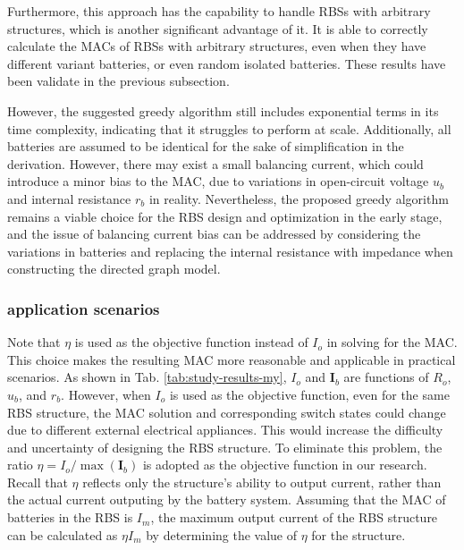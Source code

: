 \documentclass{article}
\begin{document}
Furthermore, this approach has the capability to handle RBSs with arbitrary structures, which is another significant advantage of it. 
It is able to correctly calculate the MACs of RBSs with arbitrary structures, even when they have different variant batteries, or even random isolated batteries. 
These results have been validate in the previous subsection.


However, the suggested greedy algorithm still includes exponential terms in its time complexity, indicating that it struggles to perform at scale. 
Additionally, all batteries are assumed to be identical for the sake of simplification in the derivation.
However, there may exist a small balancing current, which could introduce a minor bias to the MAC, due to variations in open-circuit voltage $u_b$ and internal resistance $r_b$ in reality.
Nevertheless, the proposed greedy algorithm remains a viable choice for the RBS design and optimization in the early stage, and the issue of balancing current bias can be addressed by considering the variations in batteries and replacing the internal resistance with impedance when constructing the directed graph model.

\subsubsection{application scenarios}

Note that $\eta$ is used as the objective function instead of $I_o$ in solving for the MAC. 
This choice makes the resulting MAC more reasonable and applicable in practical scenarios. 
As shown in Tab. \ref{tab:study-results-my}, $I_o$ and $\bm{I}_b$ are functions of $R_o$, $u_b$, and $r_b$. 
However, when $I_o$ is used as the objective function, even for the same RBS structure, the MAC solution and corresponding switch states could change due to different external electrical appliances.
This would increase the difficulty and uncertainty of designing the RBS structure. 
To eliminate this problem, the ratio $\eta=I_o/\max(\bm{I}_b)$ is adopted as the objective function in our research.
Recall that $\eta$ reflects only the structure's ability to output current, rather than the actual current outputing by the battery system.
Assuming that the MAC of batteries in the RBS is $I_m$, the maximum output current of the RBS structure can be calculated as $\eta I_m$ by determining the value of $\eta$ for the structure. 
\end{document}
